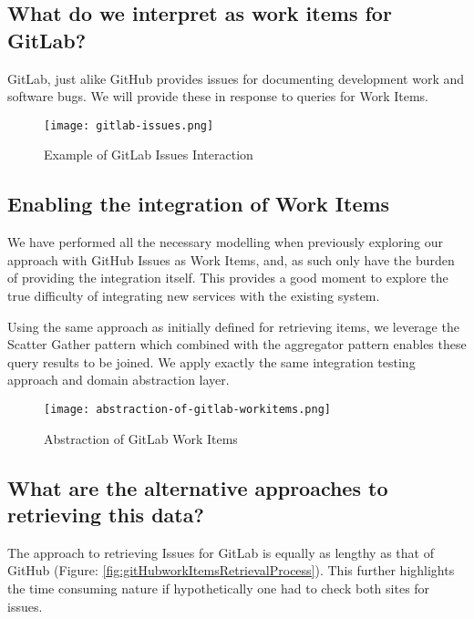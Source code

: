 
\subsection{What do we interpret as work items for GitLab?}

GitLab, just alike GitHub provides issues for documenting development work and software bugs. We will provide these in response to queries for Work Items.

\begin{figure}[h!]
	\centering
	\texttt{[image: gitlab-issues.png]}
	\label{fig:gitlabIssuesExample}
	\caption{Example of GitLab Issues Interaction}
\end{figure}

\subsection{Enabling the integration of Work Items}

We have performed all the necessary modelling when previously exploring our approach with GitHub Issues as Work Items, and, as such only have the burden of providing the integration itself. This provides a good moment to explore the true difficulty of integrating new services with the existing system.

Using the same approach as initially defined for retrieving items, we leverage the Scatter Gather pattern which combined with the aggregator pattern enables these query results to be joined. We apply exactly the same integration testing approach and domain abstraction layer.

\begin{figure}[h!]
	\centering
	\texttt{[image: abstraction-of-gitlab-workitems.png]}
	\caption{Abstraction of GitLab Work Items}
	\label{fig:abstractionOfGitLabWorkItems}
\end{figure}

\subsection{What are the alternative approaches to retrieving this data?}

The approach to retrieving Issues for GitLab is equally as lengthy as that of GitHub (Figure: \ref{fig:gitHubworkItemsRetrievalProcess}). This further highlights the time consuming nature if hypothetically one had to check both sites for issues.

